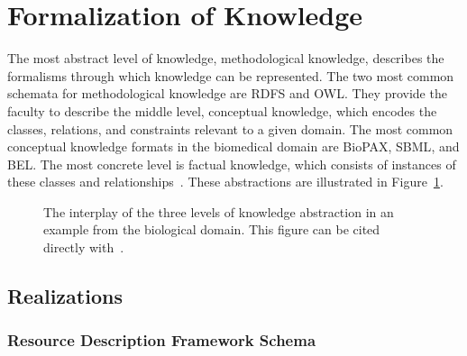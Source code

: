 \section{Formalization of Knowledge}

The most abstract level of knowledge, methodological knowledge, describes the formalisms through which knowledge can be represented.
The two most common schemata for methodological knowledge are \ac{RDFS} and \ac{OWL}.
They provide the faculty to describe the middle level, conceptual knowledge, which encodes the classes, relations, and constraints relevant to a given domain.
The most common conceptual knowledge formats in the biomedical domain are \ac{BioPAX}, \ac{SBML}, and \ac{BEL}.
The most concrete level is factual knowledge, which consists of instances of these classes and relationships~\cite{Marchetti2008}.
These abstractions are illustrated in Figure~\ref{fig:knowledge_types}.

\begin{figure}
    \captionsetup{format=plain}
    \caption[Levels of Knowledge Abstraction]{The interplay of the three levels of knowledge abstraction in an example from the biological domain. This figure can be cited directly with~\cite{Hoyt2019KnowledgeLevels}.}
    \label{fig:knowledge_types}
\end{figure}

\subsection{Realizations}

\subsubsection{Resource Description Framework Schema}

